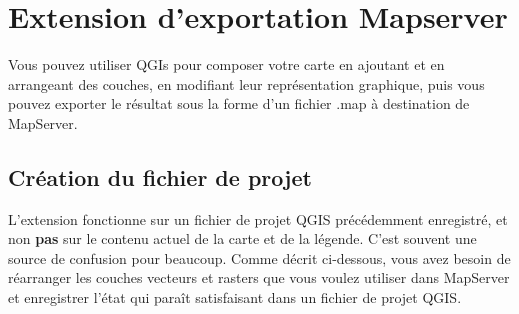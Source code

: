 
\section{Extension d'exportation Mapserver}\label{sec:mapserver_export}



Vous pouvez utiliser QGIs pour composer votre carte en ajoutant et en arrangeant des couches, en modifiant leur représentation graphique, puis vous pouvez exporter le résultat sous la forme d'un fichier .map à destination de MapServer.

\subsection{Création du fichier de projet}


L'extension fonctionne sur un fichier de projet QGIS précédemment enregistré, et non 
\textbf{pas} sur le contenu actuel de la carte et de la légende. C'est souvent une source 
de confusion pour beaucoup. Comme décrit ci-dessous, vous avez besoin de réarranger les 
couches vecteurs et rasters que vous voulez utiliser dans MapServer et enregistrer l'état 
qui paraît satisfaisant dans un fichier de projet QGIS.

